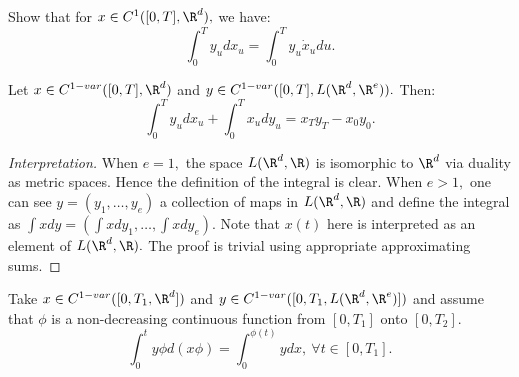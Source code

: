 \begin{exercise}
    Show that for $x \in C^1([0,T],\R^d),$ we have:
    \begin{equation}
        \int_0^T y_u dx_u = \int_0^T y_u \dot{x}_u du.
    \end{equation}
\end{exercise}

\begin{prop}
    Let $x \in C^{1-var}([0,T],\R^d)$ and $y\in C^{1-var}([0,T], L(\R^d, \R^e)).$ Then:
    \begin{equation}
        \int_0^T y_u dx_u + \int_0^T x_u dy_u = x_T y_T - x_0 y_0.
    \end{equation}
\end{prop}
\begin{proof}[Interpretation]
    When $e=1,$ the space $L(\R^d, \R)$ is isomorphic to $\R^d$ via duality as metric spaces. 
    Hence the definition of the integral is clear.
    When $e>1,$ one can see $y = (y_1, \ldots, y_e)$ a collection of maps in $L(\R^d, \R)$ and define the integral as $\int x dy = (\int x dy_1, \ldots, \int x dy_e).$
    Note that $x(t)$ here is interpreted as an element of $L(\R^d, \R).$
    The proof is trivial using appropriate approximating sums.
\end{proof}

\begin{exercise}
    Take $x \in C^{1-var}([0,T_1, \R^d])$ and $y \in C^{1-var}([0,T_1, L(\R^d,\R^e)])$ and assume that $\phi$ is a non-decreasing continuous function from $[0,T_1]$ onto $[0,T_2].$ 
    \begin{equation}
        \int_0^t y\phi d(x\phi) = \int_0^{\phi(t)} y dx, \ \forall t \in [0,T_1].
    \end{equation} 
\end{exercise}

